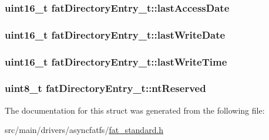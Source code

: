 \hypertarget{structfatDirectoryEntry__t_a3be85a0eeefcdbdc580b50bfd1bb3b3a}{
\subsubsection[{last\+Access\+Date}]{\setlength{\rightskip}{0pt plus 5cm}uint16\+\_\+t fat\+Directory\+Entry\+\_\+t\+::last\+Access\+Date}}\label{structfatDirectoryEntry__t_a3be85a0eeefcdbdc580b50bfd1bb3b3a}
\hypertarget{structfatDirectoryEntry__t_a9e46083acccd6c1ebb27bd38f8a5607a}{
\subsubsection[{last\+Write\+Date}]{\setlength{\rightskip}{0pt plus 5cm}uint16\+\_\+t fat\+Directory\+Entry\+\_\+t\+::last\+Write\+Date}}\label{structfatDirectoryEntry__t_a9e46083acccd6c1ebb27bd38f8a5607a}
\hypertarget{structfatDirectoryEntry__t_a8deabe41bb3ec985fb82764d847a0f67}{
\subsubsection[{last\+Write\+Time}]{\setlength{\rightskip}{0pt plus 5cm}uint16\+\_\+t fat\+Directory\+Entry\+\_\+t\+::last\+Write\+Time}}\label{structfatDirectoryEntry__t_a8deabe41bb3ec985fb82764d847a0f67}
\hypertarget{structfatDirectoryEntry__t_a07bf5f37360aa02419bc65e411754916}{
\subsubsection[{nt\+Reserved}]{\setlength{\rightskip}{0pt plus 5cm}uint8\+\_\+t fat\+Directory\+Entry\+\_\+t\+::nt\+Reserved}}\label{structfatDirectoryEntry__t_a07bf5f37360aa02419bc65e411754916}


The documentation for this struct was generated from the following file\+:\begin{DoxyCompactItemize}
\item 
src/main/drivers/asyncfatfs/\hyperlink{fat__standard_8h}{fat\+\_\+standard.\+h}\end{DoxyCompactItemize}
